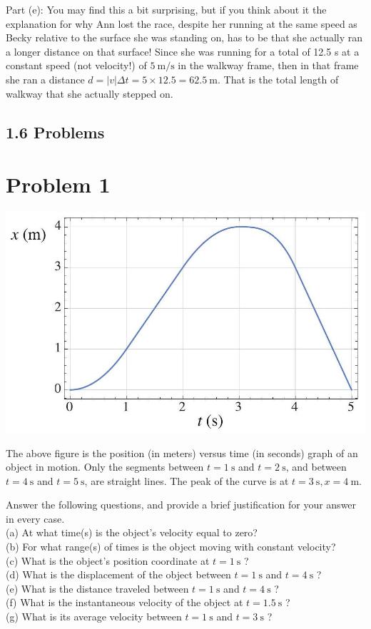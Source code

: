 \documentclass[10pt]{article}
\begin{document}
Part (e): You may find this a bit surprising, but if you think about it the explanation for why Ann lost the race, despite her running at the same speed as Becky relative to the surface she was standing on, has to be that she actually ran a longer distance on that surface! Since she was running for a total of 12.5 s at a constant speed (not velocity!) of $5 \mathrm{~m} / \mathrm{s}$ in the walkway frame, then in that frame she ran a distance $d=|v| \Delta t=5 \times 12.5=62.5 \mathrm{~m}$. That is the total length of walkway that she actually stepped on.

\subsection*{1.6 Problems}
\section*{Problem 1}
\begin{center}
\includegraphics[max width=\textwidth]{2024_09_14_9969b06773f10b6936e8g-045}
\end{center}

The above figure is the position (in meters) versus time (in seconds) graph of an object in motion. Only the segments between $t=1 \mathrm{~s}$ and $t=2 \mathrm{~s}$, and between $t=4 \mathrm{~s}$ and $t=5 \mathrm{~s}$, are straight lines. The peak of the curve is at $t=3 \mathrm{~s}, x=4 \mathrm{~m}$.

Answer the following questions, and provide a brief justification for your answer in every case.\\
(a) At what time(s) is the object's velocity equal to zero?\\
(b) For what range(s) of times is the object moving with constant velocity?\\
(c) What is the object's position coordinate at $t=1 \mathrm{~s}$ ?\\
(d) What is the displacement of the object between $t=1 \mathrm{~s}$ and $t=4 \mathrm{~s}$ ?\\
(e) What is the distance traveled between $t=1 \mathrm{~s}$ and $t=4 \mathrm{~s}$ ?\\
(f) What is the instantaneous velocity of the object at $t=1.5 \mathrm{~s}$ ?\\
(g) What is its average velocity between $t=1 \mathrm{~s}$ and $t=3 \mathrm{~s}$ ?
\end{document}
